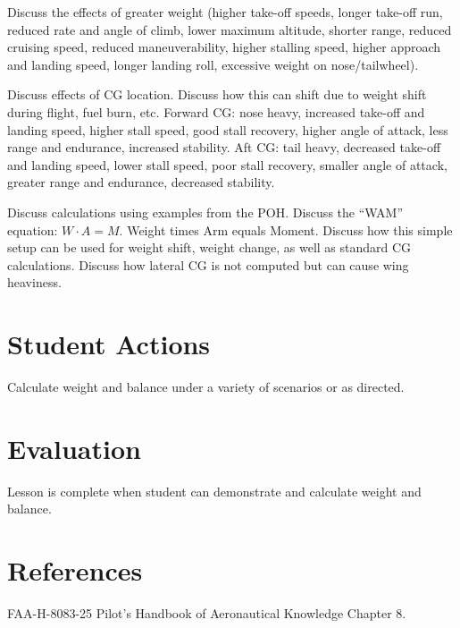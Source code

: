 Discuss the effects of greater weight (higher take-off speeds, longer take-off
run, reduced rate and angle of climb, lower maximum altitude, shorter range,
reduced cruising speed, reduced maneuverability, higher stalling speed, higher
approach and landing speed, longer landing roll, excessive weight on
nose/tailwheel).

Discuss effects of CG location. Discuss how this can shift due to weight shift
during flight, fuel burn, etc. Forward CG: nose heavy, increased take-off and
landing speed, higher stall speed, good stall recovery, higher angle of attack,
less range and endurance, increased stability. Aft CG: tail heavy, decreased
take-off and landing speed, lower stall speed, poor stall recovery, smaller
angle of attack, greater range and endurance, decreased stability.

Discuss calculations using examples from the POH. Discuss the ``WAM'' equation:
$W \cdot A = M$. Weight times Arm equals Moment. Discuss how this simple setup
can be used for weight shift, weight change, as well as standard CG
calculations.  Discuss how lateral CG is not computed but can cause wing
heaviness.

\section{Student Actions}

Calculate weight and balance under a variety of scenarios or as directed.

\section{Evaluation}

Lesson is complete when student can demonstrate and calculate weight and balance.

\section{References}

FAA-H-8083-25 Pilot’s Handbook of Aeronautical Knowledge Chapter 8.

